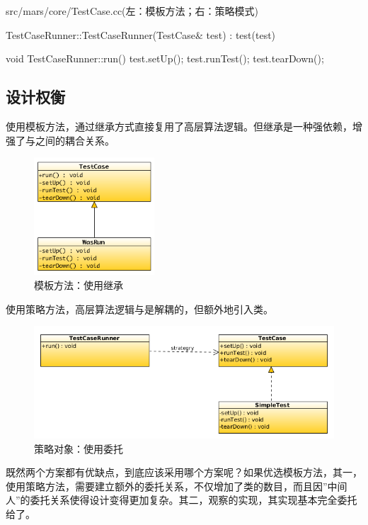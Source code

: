 \begin{content}
\begin{diff}{src/mars/core/TestCase.cc(左：模板方法；右：策略模式)}
\begin{minicpp}
TestCaseRunner::TestCaseRunner(TestCase& test)
  : test(test) {}

void TestCaseRunner::run() {
  test.setUp();
  test.runTest();
  test.tearDown();
}
\end{minicpp} 
\end{diff}

\subsection{设计权衡}

使用模板方法，通过继承方式直接复用了高层算法逻辑。但继承是一种强依赖，增强了与之间的耦合关系。

\begin{figure}[H]
\centering
\includegraphics[width=0.4\textwidth]{figures/xunit/simple-test.png}
\caption{模板方法：使用继承}
 \label{fig:simple-test}
\end{figure}

使用策略方法，高层算法逻辑与是解耦的，但额外地引入类。

\begin{figure}[H]
\centering
\includegraphics[width=1.0\textwidth]{figures/xunit/simple-test-strategry.png}
\caption{策略对象：使用委托}
 \label{fig:simple-test-strategry}
\end{figure}

既然两个方案都有优缺点，到底应该采用哪个方案呢？如果优选模板方法，其一，使用策略方法，需要建立额外的委托关系，不仅增加了类的数目，而且因''中间人''的委托关系使得设计变得更加复杂。其二，观察的实现，其实现基本完全委托给了。


\end{content}
